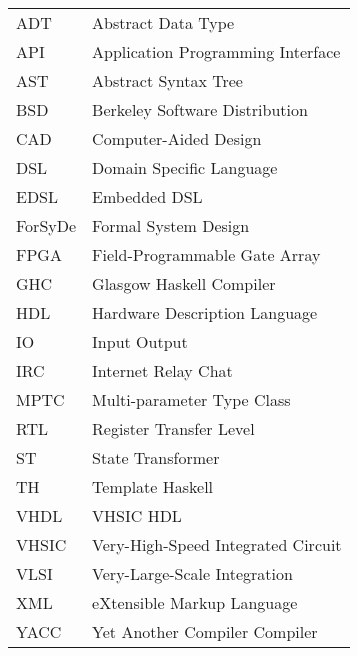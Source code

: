 \begin{longtable}{p{}p{}}
ADT & Abstract Data Type \\
API & Application Programming Interface\\
AST & Abstract Syntax Tree\\
BSD & Berkeley Software Distribution\\
CAD & Computer-Aided Design\\
DSL& Domain Specific Language\\
EDSL & Embedded DSL\\
ForSyDe & Formal System Design \\
FPGA& Field-Programmable Gate Array\\
GHC & Glasgow Haskell Compiler\\
HDL & Hardware Description Language\\
IO & Input Output\\
IRC & Internet Relay Chat\\
MPTC & Multi-parameter Type Class\\
RTL & Register Transfer Level\\
ST & State Transformer \\
TH& Template Haskell\\
VHDL & VHSIC HDL\\
VHSIC & Very-High-Speed Integrated Circuit\\
VLSI & Very-Large-Scale Integration \\
XML & eXtensible Markup Language\\
YACC & Yet Another Compiler Compiler\\
\end{longtable}